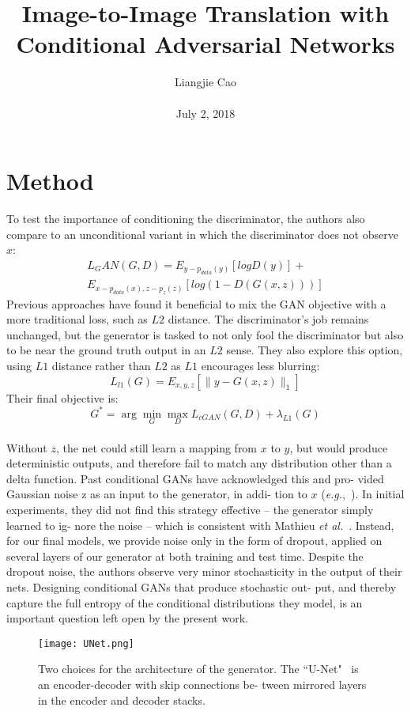 \documentclass[10pt,twocolumn,letterpaper]{article}
\begin{document}
\title{\textbf{Image-to-Image Translation with Conditional Adversarial Networks
}}
\author{Liangjie Cao\\\\ July 2, 2018}
\maketitle
\section{Method}
To test the importance of conditioning the discriminator, the authors also compare to an unconditional variant in which the discriminator does not observe $x$:
 \begin{equation}
 \begin{split}
 L_GAN(G,D)=E_{y-p_{data}(y)}[logD(y)]+\\E_{x-p_{data}(x),z-p_z(z)}[log(1-D(G(x,z)))]
 \end{split}
 \end{equation}
 Previous approaches have found it beneficial to mix the GAN objective with a more traditional loss, such as $L2$ distance. The discriminator's job remains unchanged, but the generator is tasked to not only fool the discriminator but also to be near the ground truth output in an $L2$ sense. They also explore this option, using $L1$ distance rather than $L2$ as $L1$ encourages less blurring:
 \begin{equation}
 L_{l1}(G)=E_{x,y,z}[\parallel{y}-G(x,z)\parallel_1]
 \end{equation}
 Their final objective is:
 \begin{equation}
  G^*=\arg\min_{G}\max_{D}L_{cGAN}(G,D)+\lambda_{L1}(G)
 \end{equation}
\\ Without $z$, the net could still learn a mapping from $x$ to
$y$, but would produce deterministic outputs, and therefore
fail to match any distribution other than a delta function.
Past conditional GANs have acknowledged this and pro-
vided Gaussian noise z as an input to the generator, in addi-
tion to $x$ (\emph{e.g.},~\cite{name39}). In initial experiments, they did not find this strategy effective – the generator simply learned to ig-
nore the noise – which is consistent with Mathieu \emph{et al.}~\cite{name27}.
Instead, for our final models, we provide noise only in the
form of dropout, applied on several layers of our generator
at both training and test time. Despite the dropout noise, the authors observe very minor stochasticity in the output of their nets.
Designing conditional GANs that produce stochastic out-
put, and thereby capture the full entropy of the conditional
distributions they model, is an important question left open
by the present work.
 \begin{figure}[!htb]
 \centering
 \texttt{[image: UNet.png]}\\
 \caption{Two choices for the architecture of the generator. The
``U-Net"~\cite{name34} is an encoder-decoder with skip connections be-
tween mirrored layers in the encoder and decoder stacks.}\label{Figure1}
 \end{figure}
\end{document}
